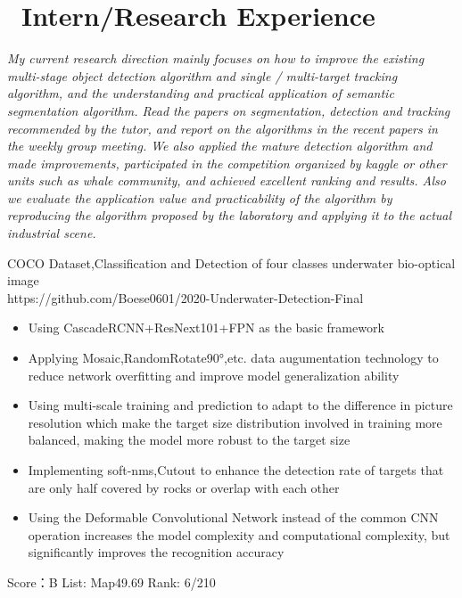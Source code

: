 \documentclass{resume}
\begin{document}
	\section{\faUsers\ Intern/Research Experience}
	\textit{My current research direction mainly focuses on how to improve the existing multi-stage object detection algorithm and single / multi-target tracking algorithm, and the understanding and practical application of semantic segmentation algorithm. Read the papers on segmentation, detection and tracking recommended by the tutor, and report on the algorithms in the recent papers in the weekly group meeting.
		We also applied the mature detection algorithm and made improvements, participated in the competition organized by kaggle or other units such as whale community, and achieved excellent ranking and results. Also we evaluate the application value and practicability of the algorithm by reproducing the algorithm proposed by the laboratory and applying it to the actual industrial scene.
	}
	
	\begin{onehalfspacing}
		COCO Dataset,Classification and Detection of four classes underwater bio-optical image\\https://github.com/Boese0601/2020-Underwater-Detection-Final
		\begin{itemize}
			\item Using CascadeRCNN+ResNext101+FPN as the basic framework
			\item Applying Mosaic,RandomRotate90°,etc. data augumentation technology to reduce network overfitting and improve model
			generalization ability

			\item Using multi-scale training and prediction to adapt to the difference in picture resolution which make the target size
			distribution involved in training more balanced, making the model more robust to the target size
			\item Implementing soft-nms,Cutout to enhance the detection rate of targets that are only half covered by rocks or overlap with each other
			\item Using the Deformable Convolutional Network instead of the common CNN operation increases the model complexity and computational complexity, but significantly improves the recognition accuracy
		\end{itemize}
		Score：B List: Map49.69 Rank: 6/210
	\end{onehalfspacing}
	
\end{document}
